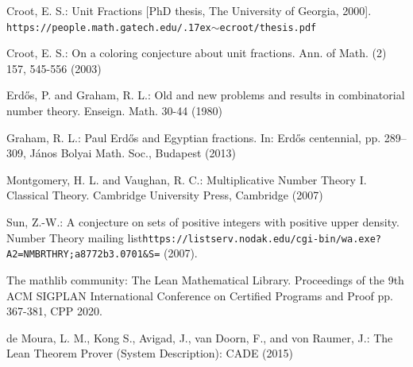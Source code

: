 \documentclass[12pt]{amsart}
\begin{document}
\begin{thebibliography}{0}

Croot, E. S.: Unit Fractions [PhD thesis, The University of Georgia, 2000]. \texttt{https://people.math.gatech.edu/{{\raise.17ex\hbox{$\scriptstyle\sim$}}}ecroot/thesis.pdf}

Croot, E. S.: On a coloring conjecture about unit fractions. Ann. of Math. (2) 157, 545-556 (2003)

Erd\H{o}s, P. and Graham, R. L.: Old and new problems and results in combinatorial number theory. Enseign. Math. 30-44 (1980)

Graham, R. L.: Paul Erd\H{o}s and Egyptian fractions. In: Erd\H{o}s centennial, pp. 289–309, János Bolyai Math. Soc., Budapest (2013)

Montgomery, H. L. and Vaughan, R. C.: Multiplicative Number Theory I. Classical Theory. Cambridge University Press, Cambridge (2007)

Sun, Z.-W.: A conjecture on sets of positive integers with positive upper density. Number Theory mailing list\newline \texttt{https://listserv.nodak.edu/cgi-bin/wa.exe?A2=NMBRTHRY;a8772b3.0701{\&}S=} (2007). 

The mathlib community: The Lean Mathematical Library. Proceedings of the 9th ACM SIGPLAN International Conference on Certified Programs and Proof pp. 367-381, CPP 2020.

de Moura, L. M., Kong S., Avigad, J., van Doorn, F., and von Raumer, J.: The Lean Theorem Prover (System Description): CADE (2015)
\end{thebibliography}
\end{document}
